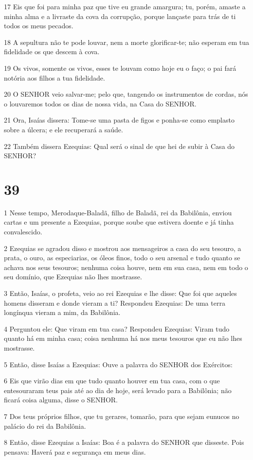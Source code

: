 \par 17 Eis que foi para minha paz que tive eu grande amargura; tu, porém, amaste a minha alma e a livraste da cova da corrupção, porque lançaste para trás de ti todos os meus pecados.
\par 18 A sepultura não te pode louvar, nem a morte glorificar-te; não esperam em tua fidelidade os que descem à cova.
\par 19 Os vivos, somente os vivos, esses te louvam como hoje eu o faço; o pai fará notória aos filhos a tua fidelidade.
\par 20 O SENHOR veio salvar-me; pelo que, tangendo os instrumentos de cordas, nós o louvaremos todos os dias de nossa vida, na Casa do SENHOR.
\par 21 Ora, Isaías dissera: Tome-se uma pasta de figos e ponha-se como emplasto sobre a úlcera; e ele recuperará a saúde.
\par 22 Também dissera Ezequias: Qual será o sinal de que hei de subir à Casa do SENHOR?

\chapter{39}

\par 1 Nesse tempo, Merodaque-Baladã, filho de Baladã, rei da Babilônia, enviou cartas e um presente a Ezequias, porque soube que estivera doente e já tinha convalescido.
\par 2 Ezequias se agradou disso e mostrou aos mensageiros a casa do seu tesouro, a prata, o ouro, as especiarias, os óleos finos, todo o seu arsenal e tudo quanto se achava nos seus tesouros; nenhuma coisa houve, nem em sua casa, nem em todo o seu domínio, que Ezequias não lhes mostrasse.
\par 3 Então, Isaías, o profeta, veio ao rei Ezequias e lhe disse: Que foi que aqueles homens disseram e donde vieram a ti? Respondeu Ezequias: De uma terra longínqua vieram a mim, da Babilônia.
\par 4 Perguntou ele: Que viram em tua casa? Respondeu Ezequias: Viram tudo quanto há em minha casa; coisa nenhuma há nos meus tesouros que eu não lhes mostrasse.
\par 5 Então, disse Isaías a Ezequias: Ouve a palavra do SENHOR dos Exércitos:
\par 6 Eis que virão dias em que tudo quanto houver em tua casa, com o que entesouraram teus pais até ao dia de hoje, será levado para a Babilônia; não ficará coisa alguma, disse o SENHOR.
\par 7 Dos teus próprios filhos, que tu gerares, tomarão, para que sejam eunucos no palácio do rei da Babilônia.
\par 8 Então, disse Ezequias a Isaías: Boa é a palavra do SENHOR que disseste. Pois pensava: Haverá paz e segurança em meus dias.

